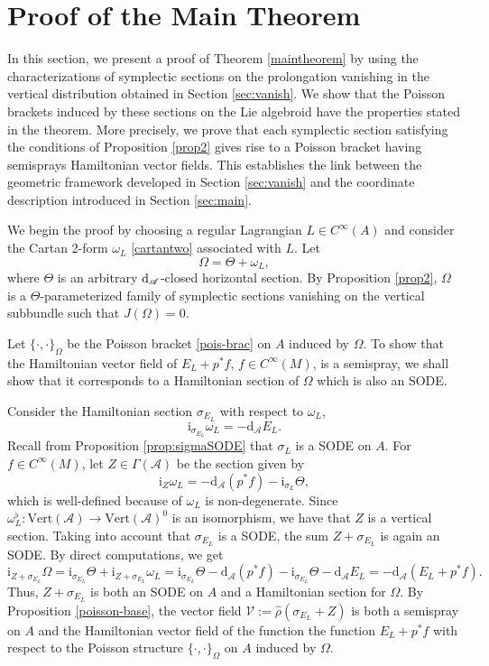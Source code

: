 \documentclass[12pt,letterpaper]{article}
\newcommand{\A}{\mathscr{A}}
\let\oldd\d
\renewcommand{\d}{%
  \relax\ifmmode\mathrm{d}\else\oldd\fi
}
\renewcommand{\hat}{\widehat}
\numberwithin{equation}{section}
\begin{document}
\section{Proof of the Main Theorem}\label{sec:proof}

In this section, we present a proof of Theorem \ref{maintheorem} by using 
the characterizations of symplectic sections on the prolongation vanishing in the vertical distribution obtained in Section \ref{sec:vanish}.
We show that the Poisson brackets induced by these sections on the Lie algebroid have the properties stated in the theorem.
More precisely, we prove that each symplectic section satisfying the conditions of Proposition \ref{prop2}
gives rise to a Poisson bracket having semisprays Hamiltonian vector fields.
This establishes the link between the geometric framework developed in Section \ref{sec:vanish} 
and the coordinate description introduced in Section \ref{sec:main}.

We begin the proof by choosing  a regular Lagrangian $L\in C^\infty(A)$ 
and consider the Cartan 2-form $\omega_L$ \eqref{cartantwo} associated with $L$. Let
\[
  \Omega = \Theta + \omega_L,
\]
where $\Theta$ is an arbitrary $\d_\A$-closed horizontal section. 
By Proposition \ref{prop2}, $\Omega$ is a $\Theta$-parameterized family of symplectic sections 
vanishing on the vertical subbundle such that $J(\Omega)=0$. 

Let $\{ \cdot,\cdot \}_{\Omega}$ be the Poisson bracket \eqref{pois-brac} on $A$ induced by $\Omega$.
To show that the Hamiltonian vector field of $E_L +p^*f$, $f\in C^\infty(M)$, is a semispray,
we shall show that it corresponds to a Hamiltonian section of $\Omega$ which is also an SODE.  

Consider the Hamiltonian section $\sigma_{E_L} $ with respect to $\omega_L$,
$$ \mathrm{i}_{\sigma_{E_L} }\omega_L = - \mathrm{ d}_{\mathscr{A}} E_L.$$
Recall from Proposition \ref{prop:sigmaSODE} that $\sigma_L$ is a SODE on $A$.
For $f\in C^\infty(M)$, let $Z\in \Gamma(\mathscr{A})$ be the section given by
$$\mathrm{i}_Z \omega_L = -\mathrm{ d}_{\mathscr{A}}(p^*f) - \mathrm{i}_{\sigma_L }\Theta,$$
which is well-defined because of $\omega_L$ is non-degenerate. 
Since $\omega_L^{\flat}:\mathrm{Vert}(\A)\to \mathrm{Vert}(\A)^0$ is an isomorphism,
we have that $Z$ is a vertical section.
Taking into account that $\sigma_{E_L}$ is a SODE, the sum $Z+ \sigma_{E_L}$ is again an SODE. 
By direct computations, we get
\[
\mathrm{i}_{Z +\sigma_{E_L}}\Omega = \mathrm{i}_{\sigma_{E_L} }\Theta + \mathrm{i}_{Z +\sigma_{E_L}}\omega_L = \mathrm{i}_{\sigma_{E_L} }\Theta - \mathrm{ d}_{\mathscr{A}}(p^*f) - \mathrm{i}_{\sigma_{E_L} }\Theta - \mathrm{ d}_{\mathscr{A}} E_L
= - \mathrm{ d}_{\mathscr{A}}( E_L + p^*f).
\]
Thus, $Z +\sigma_{E_L} $ is both an SODE on $A$ and a Hamiltonian section for $\Omega$. 
By Proposition \ref{poisson-base}, the vector field $\mathcal{V}:=\hat{\rho}(\sigma_{E_L} + Z)$ is both a semispray on $A$ and
the Hamiltonian vector field of the function the function $E_L+p^*f$ with respect to the Poisson structure $\{ \cdot,\cdot \}_{\Omega} $ on $A$ induced by $\Omega$.
\end{document}
